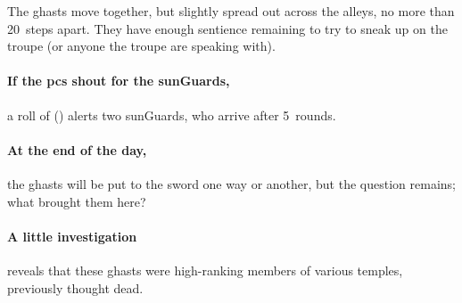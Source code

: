 The ghasts move together, but slightly spread out across the alleys, no more than 20~\glspl{step} apart.
They have enough sentience remaining to try to sneak up on the troupe (or anyone the troupe are speaking with).

\paragraph{If the \glspl{pc} shout for the \glspl{sunGuard},}
a roll of  (\tn[7]) alerts two \glspl{sunGuard}, who arrive after 5~\glspl{round}.

\paragraph{At the end of the day,}
the ghasts will be put to the sword one way or another, but the question remains; what brought them here?

\paragraph{A little investigation}
reveals that these ghasts were high-ranking members of various temples, previously thought dead.


